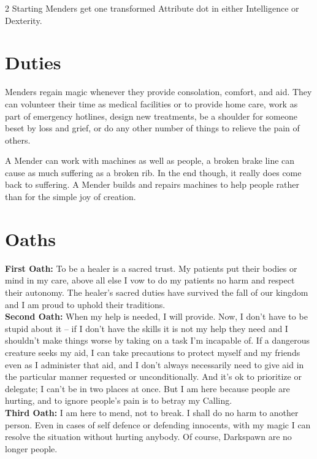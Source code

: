 \begin{multicols}{2}
Starting Menders get one transformed Attribute dot in either Intelligence or Dexterity. 

\section*{Duties}

Menders regain magic whenever they provide consolation, comfort, and aid. They can volunteer their time as medical facilities or to provide home care, work as part of emergency hotlines, design new treatments, be a shoulder for someone beset by loss and grief, or do any other number of things to relieve the pain of others. 

A Mender can work with machines as well as people, a broken brake line can cause as much suffering as a broken rib. In the end though, it really does come back to suffering. A Mender builds and repairs machines to help people rather than for the simple joy of creation. 

\section*{Oaths}
\noindent \textbf{First Oath:} To be a healer is a sacred trust. My patients put their bodies or mind in my care, above all else I vow to do my patients no harm and respect their autonomy. The healer's sacred duties have survived the fall of our kingdom and I am proud to uphold their traditions. \\

\noindent \textbf{Second Oath:} When my help is needed, I will provide. Now, I don't have to be stupid about it -- if I don't have the skills it is not my help they need and I shouldn't make things worse by taking on a task I'm incapable of. If a dangerous creature seeks my aid, I can take precautions to protect myself and my friends even as I administer that aid, and I don't always necessarily need to give aid in the particular manner requested or unconditionally. And it's ok to prioritize or delegate; I can't be in two places at once. But I am here because people are hurting, and to ignore people's pain is to betray my Calling. \\

\noindent \textbf{Third Oath:} I am here to mend, not to break. I shall do no harm to another person. Even in cases of self defence or defending innocents, with my magic I can resolve the situation without hurting anybody. Of course, Darkspawn are no longer people.


\end{multicols}
